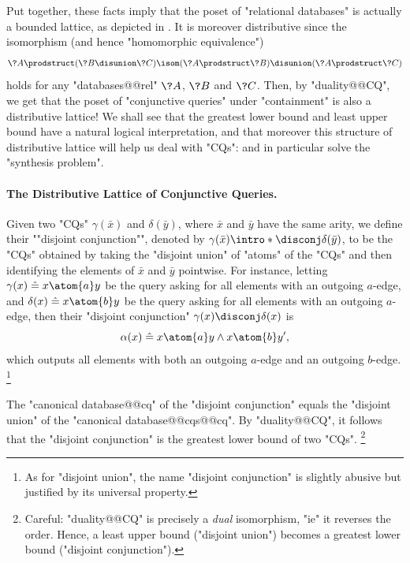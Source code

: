 Put together, these facts imply that the poset of "relational databases" is
actually a bounded lattice, as depicted in .
It is moreover distributive
since the isomorphism (and hence "homomorphic equivalence")
\[
	\?A \prodstruct (\?B \disunion \?C) \isom (\?A \prodstruct \?B) \disunion (\?A \prodstruct \?C)
\]
holds for any "databases@@rel" $\?A$, $\?B$ and $\?C$.
Then, by "duality@@CQ", we get that the poset of "conjunctive queries"
under "containment" is also a distributive lattice!
We shall see that the greatest lower bound and least upper bound
have a natural logical interpretation, and that moreover
this structure of distributive lattice will help us
deal with "CQs": and in particular
solve the "synthesis problem". 


\paragraph*{The Distributive Lattice of Conjunctive Queries.}

Given two "CQs" $\gamma(\bar x)$ and $\delta(\bar y)$,
where $\bar x$ and $\bar y$ have the same arity, we define
their \AP""disjoint conjunction"", denoted by
$\gamma(\bar x) \intro*\disconj \delta(\bar y)$,
to be the "CQs" obtained by taking the "disjoint union" of "atoms" 
of the "CQs" and then identifying the elements of $\bar x$ and $\bar y$ pointwise.
For instance, letting $\gamma(x) \defeq x \atom{a} y$ be the query
asking for all elements with an outgoing $a$-edge,
and $\delta(x) \defeq x \atom{b} y$ be the query
asking for all elements with an outgoing $a$-edge,
then their "disjoint conjunction" $\gamma(x) \disconj \delta(x)$ is
\[
	\alpha(x) \defeq x \atom{a} y \land x \atom{b} y',
\]
which outputs all elements with both an outgoing $a$-edge and an outgoing $b$-edge.%
\footnote{As for "disjoint union", the name "disjoint conjunction" is slightly abusive
but justified by its universal property.}

\begin{fact}
	The "canonical database@@cq" of the "disjoint conjunction"
	equals the "disjoint union" of the "canonical database@@cqs@@cq".
	By "duality@@CQ", it follows that
	the "disjoint conjunction" is the greatest lower bound
	of two "CQs".%
	\footnote{Careful: "duality@@CQ" is precisely a \emph{dual} isomorphism,
	"ie" it reverses the order. Hence, a least upper bound ("disjoint union")
	becomes a greatest lower bound ("disjoint conjunction").}
\end{fact}

